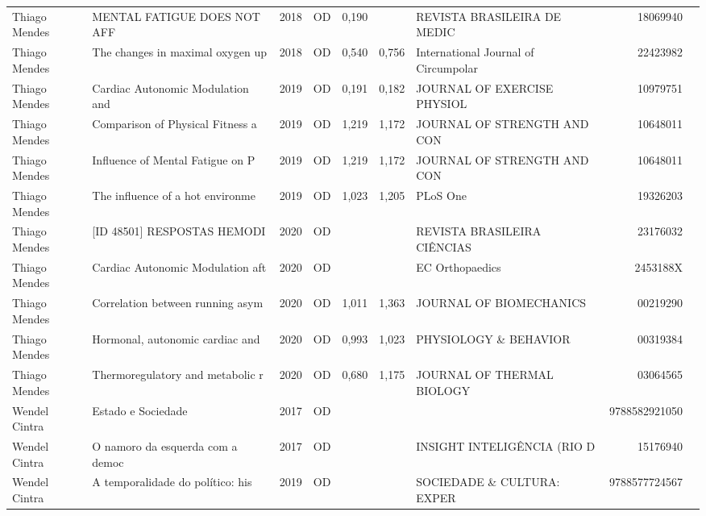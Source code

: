 \documentclass[12pt,brazil]{article}\usepackage[]{graphicx}\usepackage[]{xcolor}
\begin{document}
\begin{longtable}{lllrrllrr}
Thiago Mendes & MENTAL FATIGUE DOES NOT AFF & 2018 & OD & 0,190 &  & REVISTA BRASILEIRA DE MEDIC & 18069940 \\
Thiago Mendes & The changes in maximal oxygen up & 2018 & OD & 0,540 & 0,756 & International Journal of Circumpolar & 22423982 \\
Thiago Mendes & Cardiac Autonomic Modulation and & 2019 & OD & 0,191 & 0,182 & JOURNAL OF EXERCISE PHYSIOL & 10979751 \\
Thiago Mendes & Comparison of Physical Fitness a & 2019 & OD & 1,219 & 1,172 & JOURNAL OF STRENGTH AND CON & 10648011 \\
Thiago Mendes & Influence of Mental Fatigue on P & 2019 & OD & 1,219 & 1,172 & JOURNAL OF STRENGTH AND CON & 10648011 \\
Thiago Mendes & The influence of a hot environme & 2019 & OD & 1,023 & 1,205 & PLoS One & 19326203 \\
Thiago Mendes & [ID 48501] RESPOSTAS HEMODI & 2020 & OD &  &  & REVISTA BRASILEIRA CIÊNCIAS & 23176032 \\
\rowcolor{duplic}\rowcolor{duplic}\rowcolor{duplic}\rowcolor{duplic}\rowcolor{duplic}\rowcolor{duplic}\rowcolor{duplic}\rowcolor{duplic}\rowcolor{duplic}\rowcolor{duplic}\rowcolor{duplic}\rowcolor{duplic}\rowcolor{duplic}\rowcolor{duplic}\rowcolor{duplic}\rowcolor{duplic}Thiago Mendes & Cardiac Autonomic Modulation aft & 2020 & OD &  &  & EC Orthopaedics & 2453188X \\
Thiago Mendes & Correlation between running asym & 2020 & OD & 1,011 & 1,363 & JOURNAL OF BIOMECHANICS & 00219290 \\
Thiago Mendes & Hormonal, autonomic cardiac and  & 2020 & OD & 0,993 & 1,023 & PHYSIOLOGY \& BEHAVIOR & 00319384 \\
Thiago Mendes & Thermoregulatory and metabolic r & 2020 & OD & 0,680 & 1,175 & JOURNAL OF THERMAL BIOLOGY & 03064565 \\
Wendel Cintra & Estado e Sociedade & 2017 & OD &  &  &  & 9788582921050 \\
Wendel Cintra & O namoro da esquerda com a democ & 2017 & OD &  &  & INSIGHT INTELIGÊNCIA (RIO D & 15176940 \\
Wendel Cintra & A temporalidade do político: his & 2019 & OD &  &  & SOCIEDADE \& CULTURA: EXPER & 9788577724567 \\
\end{longtable}

\normalsize

\clearpage
\end{document}
